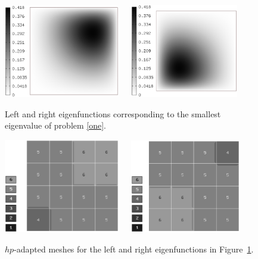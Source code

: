 \documentclass[smallextended]{svjour3}
\begin{document}
\begin{figure}[!ht]
\begin{center}
\includegraphics[width=0.45\textwidth]{eig1.eps}\ \ \ 
\includegraphics[width=0.42\textwidth]{eig2.eps}\\
\end{center}
\caption{Left and right eigenfunctions corresponding to the smallest eigenvalue of problem \eqref{one}. }
\label{fig:eigen1}
\end{figure}

\begin{figure}[!ht]
\begin{center}
\includegraphics[width=0.45\textwidth]{mesh1.eps}\ \ \ 
\includegraphics[width=0.43\textwidth]{mesh2.eps}\\
\end{center}
\caption{$hp$-adapted meshes for the left and right eigenfunctions in Figure~\ref{fig:eigen1}. }
\label{fig:mesh1}
\end{figure}
\end{document}
